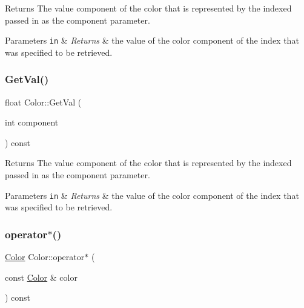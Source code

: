 \begin{DoxyReturn}{Returns}
The value component of the color that is represented by the indexed passed in as the component parameter.
\end{DoxyReturn}

\begin{DoxyParams}[1]{Parameters}
\mbox{\tt in}  & {\em Returns} & the value of the color component of the index that was specified to be retrieved. \\
\hline
\end{DoxyParams}
\mbox{\label{classColor_ae8aa52d3ec0bb13f4f9732d9487a5431}} 
\subsubsection{\texorpdfstring{Get\+Val()}{GetVal()}\hspace{0.1cm}{\footnotesize\ttfamily [2/2]}}
{\footnotesize\ttfamily float Color\+::\+Get\+Val (\begin{DoxyParamCaption}\item[{int}]{component }\end{DoxyParamCaption}) const\hspace{0.3cm}{\ttfamily [inline]}}

\begin{DoxyReturn}{Returns}
The value component of the color that is represented by the indexed passed in as the component parameter.
\end{DoxyReturn}

\begin{DoxyParams}[1]{Parameters}
\mbox{\tt in}  & {\em Returns} & the value of the color component of the index that was specified to be retrieved. \\
\hline
\end{DoxyParams}
\mbox{\label{classColor_a6cc052b0ca852fb8703e642e49fcdbe9}} 
\subsubsection{\texorpdfstring{operator$\ast$()}{operator*()}\hspace{0.1cm}{\footnotesize\ttfamily [1/4]}}
{\footnotesize\ttfamily \hyperlink{classColor}{Color} Color\+::operator$\ast$ (\begin{DoxyParamCaption}\item[{const \hyperlink{classColor}{Color} \&}]{color }\end{DoxyParamCaption}) const}



